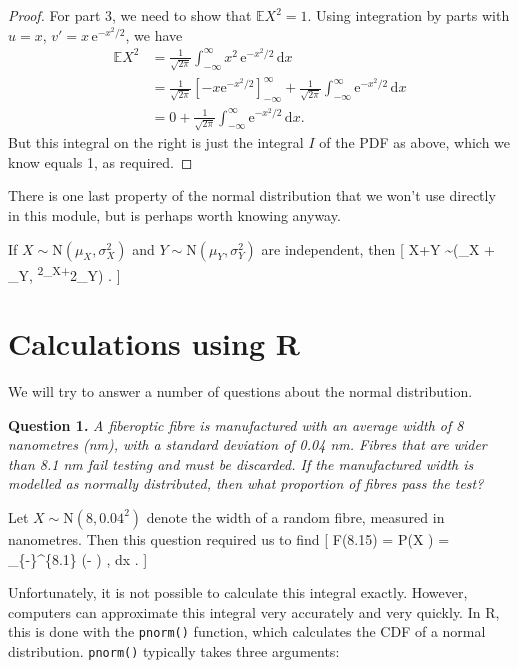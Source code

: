 \documentclass[
  letterpaper,
]{report}
\theoremstyle{definition}
\theoremstyle{definition}
\theoremstyle{remark}
\begin{document}
\begin{proof}
For part 3, we need to show that \(\mathbb EX^2 = 1\). Using integration
by parts with \(u = x\), \(v' = x\,\mathrm e^{-x^2/2}\), we have
\begin{align*}
\mathbb EX^2 &= \frac{1}{\sqrt{2\pi}} \int_{-\infty}^{\infty} x^2\,  \mathrm e^{-x^2/2}\, \mathrm dx \\
  &= \frac{1}{\sqrt{2\pi}} \left[-x \mathrm e^{-x^2/2}\right]_{-\infty}^\infty + \frac{1}{\sqrt{2\pi}} \int_{-\infty}^\infty \mathrm e^{-x^2/2} \, \mathrm dx \\
  &= 0 + \frac{1}{\sqrt{2\pi}} \int_{-\infty}^\infty \mathrm e^{-x^2/2} \, \mathrm dx .
\end{align*} But this integral on the right is just the integral \(I\)
of the PDF as above, which we know equals 1, as required.

\end{proof}

There is one last property of the normal distribution that we won't use
directly in this module, but is perhaps worth knowing anyway.

If \(X \sim \mathrm{N}(\mu_X, \sigma^2_X)\) and
\(Y\sim \mathrm{N}(\mu_Y, \sigma^2_Y)\) are independent, then {[} X+Y
\sim {}(\mu\_X + \mu\_Y,
\sigma\textsuperscript{2\_X+\sigma}2\_Y) . {]}

\hypertarget{normal-r}{%
\section{Calculations using R}\label{normal-r}}

We will try to answer a number of questions about the normal
distribution.

\textbf{Question 1.} \emph{A fiberoptic fibre is manufactured with an
average width of 8 nanometres (nm), with a standard deviation of 0.04
nm. Fibres that are wider than 8.1 nm fail testing and must be
discarded. If the manufactured width is modelled as normally
distributed, then what proportion of fibres pass the test?}

Let \(X \sim \mathrm{N}(8, 0.04^2)\) denote the width of a random fibre,
measured in nanometres. Then this question required us to find {[}
F(8.15) = \mathbb P(X ) = 
\int\_\{-\infty\}\^{}\{8.1\}
\exp \left(- \right) , \mathrm dx . {]}

Unfortunately, it is not possible to calculate this integral exactly.
However, computers can approximate this integral very accurately and
very quickly. In R, this is done with the \texttt{pnorm()} function,
which calculates the CDF of a normal distribution. \texttt{pnorm()}
typically takes three arguments:
\end{document}
